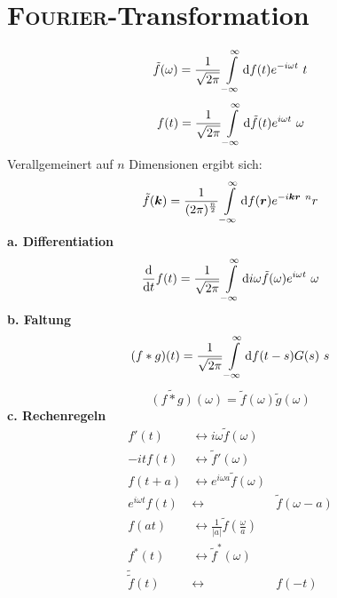 \section{\textsc{Fourier}-Transformation}
\begin{equation*}
\tilde{f}(\omega)=\frac{1}{\sqrt{2\pi}}\int\limits_{{-\infty}}^{{\infty}}\mathrm{d}{f(t)e^{-i\omega t}}\ {t}
\end{equation*}
\begin{equation*}
f(t)=\frac{1}{\sqrt{2\pi}}\int\limits_{{-\infty}}^{{\infty}}\mathrm{d}{\tilde{f}(t)e^{i\omega t}}\ {\omega}
\end{equation*}
Verallgemeinert auf $n$ Dimensionen ergibt sich:\\
\begin{equation*}
\tilde{f}(\bm{k})=\frac{1}{({2\pi})^{\frac{n}{2}}}\int\limits_{{-\infty}}^{{\infty}}\mathrm{d}{f(\bm{r})e^{-i\bm{k}\bm{r}}}\ {^nr}
\end{equation*}
\linebreak
\textbf{a. Differentiation}\\
\begin{equation*}
\frac{\mathrm{d}{}}{\mathrm{d}{t}}f(t)=\frac{1}{\sqrt{2\pi}}\int\limits_{{-\infty}}^{{\infty}}\mathrm{d}{i\omega\tilde{f}(\omega)e^{i\omega t}}\ {\omega}
\end{equation*}
\linebreak
\textbf{b. Faltung}\\
\begin{equation*}
(f*g)(t)=\frac{1}{\sqrt{2\pi}}\int\limits_{{-\infty}}^{{\infty}}\mathrm{d}{f(t-s)G(s)}\ {s}
\end{equation*}
\begin{equation*}
\widetilde{(f*g)}(\omega)=\tilde{f}(\omega)\tilde{g}(\omega)
\end{equation*}
\textbf{c. Rechenregeln}\\
\begin{align*}
f'(t) & \leftrightarrow i\omega\tilde{f}(\omega)\\
-itf(t) & \leftrightarrow \tilde{f}'(\omega)\\
f(t+a) & \leftrightarrow  e^{i\omega a}\tilde{f}(\omega)\\
e^{i\omega t}f(t) &\leftrightarrow & \tilde{f}(\omega-a)\\
f(at) & \leftrightarrow \frac{1}{|a|}\tilde{f}\left(\frac{\omega}{a}\right)\\
f^*(t) & \leftrightarrow \tilde{f}^*(\omega)\\
\tilde{\tilde{f}}(t) &\leftrightarrow & f(-t)\\
\end{align*}

